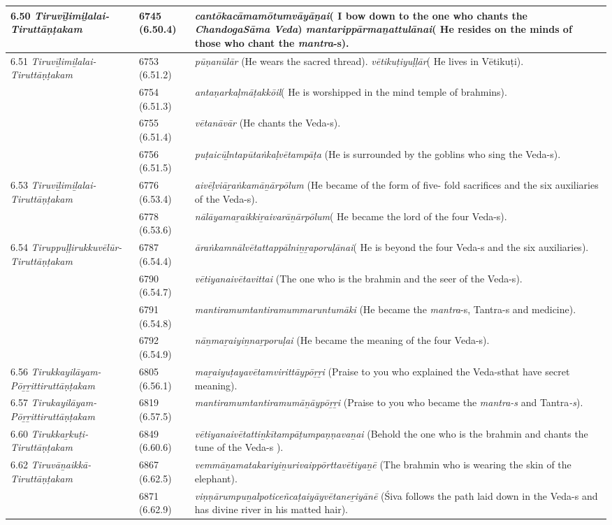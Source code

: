 \begin{longtable}{|m{2.7cm}|m{2.7cm}|>{\raggedright}m{3.1cm}|}
\hline
6.50 \textit{Tiruvīḻimiḻalai- Tiruttāṇṭakam} & 6745 (6.50.4) & \textit{cantōkacāmamōtumvā\-yāṉai}( I bow down to the one who chants the \textit{ChandogaSāma Veda}) \textit{mantarippārmaṉattulānai}( He resides on the minds of those who chant the \textit{mantra}-s). \tabularnewline
\hline
6.51 \textit{Tiruvīḻimiḻalai- Tiruttāṇṭakam} & 6753 (6.51.2) & \textit{pūṇanūlār} (He wears the sacred thread). \textit{vētikuṭiyuḷḷār}( He lives in Vētikuṭi). \tabularnewline
\hline
 & 6754 (6.51.3) & \textit{antaṇarkaḷmāṭakkōil}( He is worshipped in the mind temple of brahmins). \tabularnewline
\hline
 & 6755 (6.51.4) & \textit{vētanāvār} (He chants the Veda-s). \tabularnewline
\hline
 & 6756 (6.51.5) & \textit{puṭaicūḻntapūtaṅkaḷ\-vētampāṭa} (He is surrounded by the goblins who sing the Veda-s). \tabularnewline
\hline
6.53\textit{ Tiruvīḻimiḻalai- Tiruttāṇṭakam} & 6776 (6.53.4) & \textit{aivēḷviāṟaṅkamāṉār\-pōlum} (He became of the form of five- fold sacrifices and the six auxiliaries of the Veda-s). \tabularnewline
\hline
 & 6778 (6.53.6) & \textit{nālāyamaṟaikkiṟaiva\-rāṉārpōlum}( He became the lord of the four Veda-s). \tabularnewline
\hline
6.54 \textit{Tiruppuḷḷirukkuvēlūr- Tiruttāṇṭakam} & 6787 (6.54.4) & \textit{āraṅkamnālvētatta\-ppālniṉṟaporuḷānai}( He is beyond the four Veda-s and the six auxiliaries). \tabularnewline
\hline
 & 6790 (6.54.7) & \textit{vētiyanaivētavittai} (The one who is the brahmin and the seer of the Veda-s). \tabularnewline
\hline
 & 6791 (6.54.8) & \textit{mantiramumtantira\-mummaruntumāki} (He became the \textit{mantra}-s, Tantra-s and medicine). \tabularnewline
\hline
 & 6792 (6.54.9) & \textit{nāṉmaṟaiyiṉnaṟporuḷai} (He became the meaning of the four Veda-s). \tabularnewline
\hline
6.56 \textit{Tirukkayilāyam-Pōṟṟittiruttāṇṭakam} & 6805 (6.56.1) & \textit{maṟaiyuṭayavētamviri\-ttāypōṟṟi} (Praise to you who explained the Veda-sthat have secret meaning). \tabularnewline
\hline
6.57 \textit{Tirukayilāyam- Pōṟṟittiruttāṇṭakam} & 6819 (6.57.5) & \textit{mantiramumtantira\-mumāṉāypōṟṟi} (Praise to you who became the \textit{mantra-s} and Tantra\textit{-s}). \tabularnewline
\hline
6.60 \textit{Tirukkaṟkuṭi- Tiruttāṇṭakam} & 6849 (6.60.6) & \textit{vētiyanaivētattiṉkītam\-pāṭumpaṇṇavaṉai} (Behold the one who is the brahmin and chants the tune of the Veda-s ). \tabularnewline
\hline
6.62 \textit{Tiruvāṉaikkā- Tiruttāṇṭakam} & 6867 (6.62.5) & \textit{vemmāṉamatakariyi\-ṉurivaippōrttavētiyaṉē} (The brahmin who is wearing the skin of the elephant). \tabularnewline
\hline
 & 6871 (6.62.9) & \textit{viṇṇārumpuṉalpoti\-ceñcaṭaiyāyvētaneṟi\-yānē} (Śiva follows the path laid down in the Veda-s and has divine river in his matted hair). \tabularnewline

\end{longtable}
